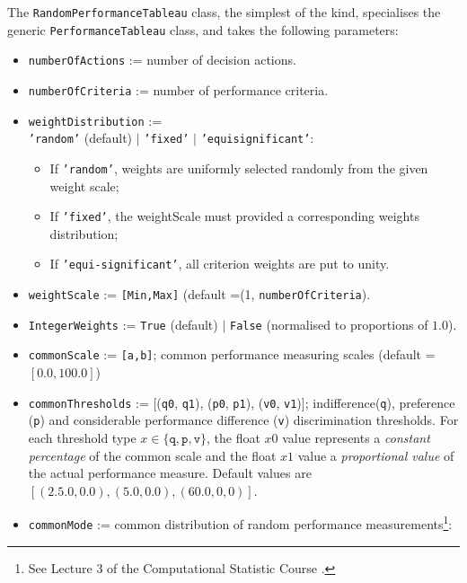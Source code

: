 The \texttt{RandomPerformanceTableau} class, the simplest of the kind, specialises the generic \texttt{PerformanceTableau} class, and takes the following parameters:
\begin{itemize}[leftmargin=0.5cm,rightmargin=0.5cm]
\item \texttt{numberOfActions} := number of decision actions.
\item \texttt{numberOfCriteria} := number of performance criteria.
\item \texttt{weightDistribution} := \\
   \texttt{'random'} (default) $|$ \texttt{'fixed'} $|$ \texttt{'equisignificant'}:
      \begin{itemize}[rightmargin=1cm,topsep=1pt]
         \item If \texttt{'random'}, weights are uniformly selected randomly from the given weight scale;
         \item If \texttt{'fixed'}, the weightScale must provided a corresponding weights distribution;
         \item If \texttt{'equi-significant'}, all criterion weights are put to unity.
      \end{itemize}
\item \texttt{weightScale} := \texttt{[Min,Max]} (default =(1, \texttt{numberOfCriteria}).
\item \texttt{IntegerWeights} := \texttt{True} (default) $|$ \texttt{False} (normalised to proportions of $1.0$).
\item \texttt{commonScale} := \texttt{[a,b]}; common performance measuring scales (default = $[0.0,100.0]$)
\item \texttt{commonThresholds} := [(\texttt{q0}, \texttt{q1}), (\texttt{p0}, \texttt{p1}), (\texttt{v0}, \texttt{v1})]; indifference(\texttt{q}), preference (\texttt{p}) and considerable performance difference (\texttt{v}) discrimination thresholds. For each threshold type $x \in \{\mathtt{q},\mathtt{p},\mathtt{v}\}$, the float $x0$ value represents a \emph{constant percentage} of the common scale and the float $x1$ value a \emph{proportional value} of the actual performance measure. Default values are $[(2.5.0,0.0), (5.0,0.0), (60.0,0,0)]$. 
\item \texttt{commonMode} := common distribution of random performance measurements\footnote{See Lecture 3 of the Computational Statistic Course \citep{CPSTAT-L3}.}:
      \begin{itemize}[rightmargin=1cm]

\end{itemize}
\end{itemize}
